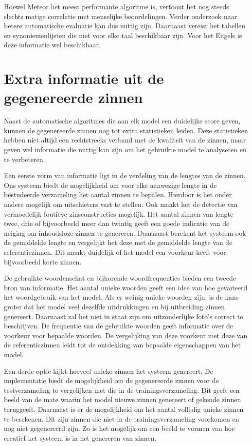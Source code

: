Hoewel Meteor het meest performante algoritme is, vertoont het nog steeds slechts matige correlatie met menselijke beoordelingen. Verder onderzoek naar betere automatische evaluatie kan dus nuttig zijn. Daarnaast vereist het tabellen en synoniemenlijsten die niet voor elke taal beschikbaar zijn. Voor het Engels is deze informatie wel beschikbaar. 


\section{Extra informatie uit de gegenereerde zinnen}
Naast de automatische algoritmes die aan elk model een duidelijke score geven, kunnen de gegenereerde zinnen nog tot extra statistieken leiden. Deze statistieken hebben niet altijd een rechtstreeks verband met de kwaliteit van de zinnen, maar geven wel informatie die nuttig kan zijn om het gebruikte model te analyseren en te verbeteren.

Een eerste vorm van informatie ligt in de verdeling van de lengtes van de zinnen. Ons systeem biedt de mogelijkheid om voor elke aanwezige lengte in de bestudeerde verzameling het aantal zinnen te bepalen. Hierdoor is het onder andere mogelijk om uitschieters vast te stellen. Ook maakt het de detectie van vermoedelijk foutieve zinsconstructies mogelijk. Het aantal zinnen van lengte twee, drie of bijvoorbeeld meer dan twintig geeft een goede indicatie van de neiging om inhoudsloze zinnen te genereren. Daarnaast berekent het systeem ook de gemiddelde lengte en vergelijkt het deze met de gemiddelde lengte van de referentiezinnen. Dit maakt duidelijk of het model een voorkeur heeft voor bijvoorbeeld korte zinnen.

De gebruikte woordenschat en bijhorende woordfrequenties bieden een tweede bron van informatie. Het aantal unieke woorden geeft een idee van hoe gevarieerd het woordgebruik van het model. Als er weinig unieke woorden zijn, is de kans groter dat het model veel dezelfde uitdrukkingen en bij uitbreiding zinnen genereert. Daarnaast zal het niet in staat zijn om uitzonderlijke foto's correct te beschrijven. De frequentie van de gebruikte woorden geeft informatie over de voorkeur voor bepaalde woorden. De vergelijking van deze voorkeur met deze van de referentiezinnen leidt tot de ontdekking van bepaalde eigenschappen van het model.

Een derde optie kijkt hoeveel unieke zinnen het systeem genereert. De implementatie biedt de mogelijkheid om de gegenereerde zinnen voor de testverzameling te vergelijken met die in de trainingsverzameling. Dit geeft een beeld van de mate waarin het model nieuwe zinnen genereert of gekende zinnen teruggeeft. Daarnaast is er de mogelijkheid om het aantal volledig unieke zinnen te berekenen. Dit zijn zinnen die niet in de trainingsverzameling voorkomen en nog niet gegenereerd zijn. Zo is het mogelijk om een beeld te vormen van hoe creatief het systeem is in het genereren van zinnen. 


